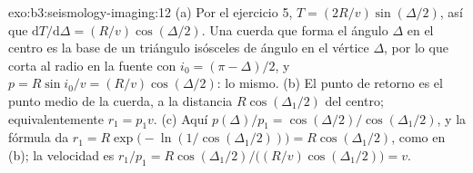 \begin{solution}{exo:b3:seismology-imaging:12}
(a) Por el ejercicio 5, $T = (2R/v)\sin(\Delta/2)$, así que $\mathrm dT/\mathrm d\Delta
= (R/v)\cos(\Delta/2)$. Una cuerda que forma el ángulo $\Delta$ en el centro es la
base de un triángulo isósceles de ángulo en el vértice $\Delta$, por lo que corta al radio
en la fuente con $i_0 = (\pi - \Delta)/2$, y $p = R\sin i_0/v =
(R/v)\cos(\Delta/2)$: lo mismo. (b) El punto de retorno es el punto medio de la
cuerda, a la distancia $R\cos(\Delta_1/2)$ del centro; equivalentemente
$r_1 = p_1v$. (c) Aquí $p(\Delta)/p_1 = \cos(\Delta/2)/\cos(\Delta_1/2)$, y
la fórmula da $r_1 = R\exp\bigl(-\ln(1/\cos(\Delta_1/2))\bigr) =
R\cos(\Delta_1/2)$, como en (b); la velocidad es $r_1/p_1 = R\cos(\Delta_1/2)\big/
\bigl((R/v)\cos(\Delta_1/2)\bigr) = v$.
\end{solution}

